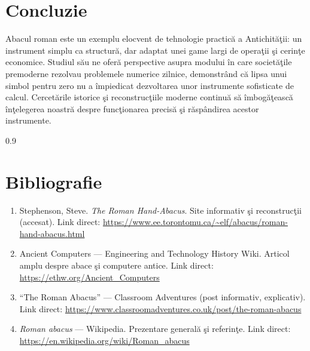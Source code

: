\documentclass[11pt,a4paper]{article}
\begin{document}
\section*{Concluzie}
Abacul roman este un exemplu elocvent de tehnologie practică a Antichităţii: un instrument simplu ca structură, dar adaptat unei game largi de operaţii şi cerinţe economice. Studiul său ne oferă perspective asupra modului în care societăţile premoderne rezolvau problemele numerice zilnice, demonstrând că lipsa unui simbol pentru zero nu a împiedicat dezvoltarea unor instrumente sofisticate de calcul. Cercetările istorice şi reconstrucţiile moderne continuă să îmbogăţească înţelegerea noastră despre funcţionarea precisă şi răspândirea acestor instrumente.

\vspace{0.5cm}
\begin{spacing}{0.9}
\section*{Bibliografie}
\begin{enumerate}
  \item Stephenson, Steve. \textit{The Roman Hand-Abacus}. Site informativ şi reconstrucţii (accesat). Link direct: \url{https://www.ee.torontomu.ca/~elf/abacus/roman-hand-abacus.html}
  \item Ancient Computers — Engineering and Technology History Wiki. Articol amplu despre abace şi computere antice. Link direct: \url{https://ethw.org/Ancient_Computers}
  \item ``The Roman Abacus'' — Classroom Adventures (post informativ, explicativ). Link direct: \url{https://www.classroomadventures.co.uk/post/the-roman-abacus}
  \item \textit{Roman abacus} — Wikipedia. Prezentare generală şi referinţe. Link direct: \url{https://en.wikipedia.org/wiki/Roman_abacus}
\end{enumerate}
\end{spacing}
\end{document}
